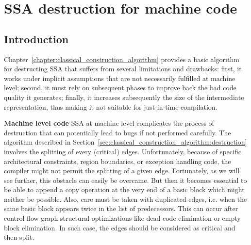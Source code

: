 \chapter{SSA destruction for machine code }
{}
\label{chap:alternative_ssa_destruction_algorithm}

\section{Introduction}
Chapter~\ref{chapter:classical_construction_algorithm} provides a basic algorithm for destructing SSA that suffers from several limitations and drawbacks: first, it works under implicit assumptions that are not necessarily fulfilled at machine level; second, it must rely on subsequent phases to improve back the bad code quality it generates; finally, it increases subsequently the size of the intermediate representation, thus making it not suitable for just-in-time compilation.   

{\bf Machine level code}
SSA at machine level complicates the process of destruction that can potentially lead to bugs if not performed carefully. The algorithm described in Section~\ref{sec:classical_construction_algorithm:destruction} involves the splitting of every (critical) edges. Unfortunately, because of specific architectural constraints, region boundaries, or exception handling code, the compiler might not permit the splitting of a given edge. Fortunately, as we will see further, this obstacle can easily be overcame. But then it becomes essential to be able to append a copy operation at the very end of a basic block which might neither be possible. Also, care must be taken with duplicated edges, i.e. when the same basic block appears twice in the list of predecessors.
This can occur after control flow graph structural optimizations like
dead code elimination or empty block elimination.
In such case, the edges should be considered as critical and then split.

